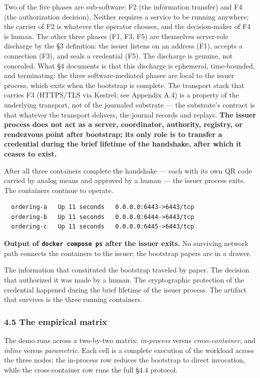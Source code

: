 \documentclass[
]{article}
\begin{document}
Two of the five phases are sub-software: F2 (the information transfer)
and F4 (the authorization decision). Neither requires a service to be
running anywhere; the carrier of F2 is whatever the operator chooses,
and the decision-maker of F4 is human. The other three phases (F1, F3,
F5) are themselves server-role discharge by the §3 definition: the
issuer listens on an address (F1), accepts a connection (F3), and seals
a credential (F5). The discharge is genuine, not concealed. What §4
documents is that this discharge is ephemeral, time-bounded, and
terminating: the three software-mediated phases are local to the issuer
process, which exits when the bootstrap is complete. The transport stack
that carries F3 (HTTPS/TLS via Kestrel; see Appendix A.4) is a property
of the underlying transport, not of the journaled substrate --- the
substrate's contract is that whatever the transport delivers, the
journal records and replays. \textbf{The issuer process does not act as
a server, coordinator, authority, registry, or rendezvous point after
bootstrap; its only role is to transfer a credential during the brief
lifetime of the handshake, after which it ceases to exist.}

After all three containers complete the handshake --- each with its own
QR code carried by analog means and approved by a human --- the issuer
process exits. The containers continue to operate.

\begin{verbatim}
  ordering-a   Up 11 seconds   0.0.0.0:6443->6443/tcp
  ordering-b   Up 11 seconds   0.0.0.0:6444->6443/tcp
  ordering-c   Up 11 seconds   0.0.0.0:6445->6443/tcp
\end{verbatim}

\textbf{Output of \texttt{docker\ compose\ ps} after the issuer exits.}
No surviving network path connects the containers to the issuer; the
bootstrap papers are in a drawer.

The information that constituted the bootstrap traveled by paper. The
decision that authorized it was made by a human. The cryptographic
protection of the credential happened during the brief lifetime of the
issuer process. The artifact that survives is the three running
containers.

\subsubsection{4.5 The empirical matrix}\label{the-empirical-matrix}

The demo runs across a two-by-two matrix: \emph{in-process} versus
\emph{cross-container}, and \emph{inline} versus \emph{parametric}. Each
cell is a complete execution of the workload across the three nodes; the
in-process row reduces the bootstrap to direct invocation, while the
cross-container row runs the full §4.4 protocol.
\end{document}
